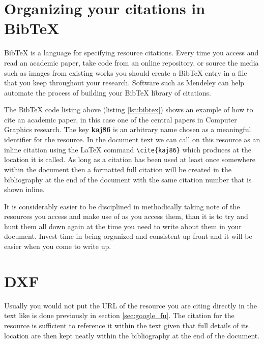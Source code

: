 	\section{Organizing your citations in BibTeX}       
		\label{sec:resources_bibtex}
	
		BibTeX is a language for specifying resource citations. Every time you access and read an academic paper, take code from an online repository, or source the media such as images from existing works you should create a BibTeX entry in a file that you keep throughout your research. Software such as Mendeley \cite{mendeley} can help automate the process of building your BibTeX library of citations. 
		
		
		
		The BibTeX code listing above (listing \ref{lst:bibtex}) shows an example of how to cite an academic paper, in this case one of the central papers in Computer Graphics research. The key \textbf{kaj86} is an arbitrary name chosen as a meaningful identifier for the resource. In the document text we can call on this resource as an inline citation using the LaTeX command \lstinline|\cite{kaj86}| which produces \cite{kaj86} at the location it is called. As long as a citation has been used at least once somewhere within the document then a formatted full citation will be created in the bibliography at the end of the document with the same citation number that is shown inline.
		
		It is considerably easier to be disciplined in methodically taking note of the resources you access and make use of as you access them, than it is to try and hunt them all down again at the time you need to write about them in your document. Invest time in being organized and consistent up front and it will be easier when you come to write up.
		
	\section{DXF}
		Usually you would not put the URL of the resource you are citing directly in the text like is done previously in section \ref{sec:google_fu}. The citation for the resource \cite{gwern} is sufficient to reference it within the text given that full details of its location are then kept neatly within the bibliography at the end of the document. 
		
